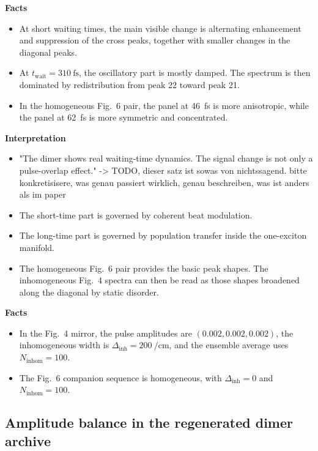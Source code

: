 \textbf{Facts}
\begin{itemize}
    \item At short waiting times, the main visible change is alternating enhancement and suppression of the cross peaks, together with smaller changes in the diagonal peaks.
    \item At $t_{\mathrm{wait}}=\SI{310}{\femto\second}$, the oscillatory part is mostly damped. The spectrum is then dominated by redistribution from peak 22 toward peak 21.
    \item In the homogeneous Fig.~6 pair, the panel at \SI{46}{\femto\second} is more anisotropic, while the panel at \SI{62}{\femto\second} is more symmetric and concentrated.
\end{itemize}

\textbf{Interpretation}
\begin{itemize}
    \item "The dimer shows real waiting-time dynamics. The signal change is not only a pulse-overlap effect." -> TODO, dieser satz ist sowas von nichtssagend. bitte konkretisisere, was genau passiert wirklich, genau beschreiben, was ist anders als im paper
    \item The short-time part is governed by coherent beat modulation.
    \item The long-time part is governed by population transfer inside the one-exciton manifold.
    \item The homogeneous Fig.~6 pair provides the basic peak shapes. The inhomogeneous Fig.~4 spectra can then be read as those shapes broadened along the diagonal by static disorder.
\end{itemize}

\textbf{Facts}
\begin{itemize}
    \item In the Fig.~4 mirror, the pulse amplitudes are $(0.002,0.002,0.002)$, the inhomogeneous width is $\Delta_{\mathrm{inh}}=\SI{200}{\per\centi\metre}$, and the ensemble average uses $N_{\mathrm{inhom}}=100$.
  \item The Fig.~6 companion sequence is homogeneous, with $\Delta_{\mathrm{inh}}=0$ and $N_{\mathrm{inhom}}=100$.
\end{itemize}


\subsection{Amplitude balance in the regenerated dimer archive}
\label{subsec:results_dimer_amplitudes}

